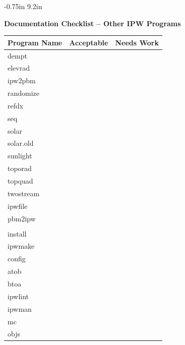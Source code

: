  
\setlength{\topmargin} {-0.75in}
\setlength{\textheight} {9.2in}
 
%
\newcommand{\marginsize}[1]{%
  \setlength{\oddsidemargin}{#1}
  \setlength{\textwidth}{8.5in}                %
  \addtolength{\textwidth}{-2\oddsidemargin}   %
  \setlength{\marginparwidth}{.75\oddsidemargin}%
  \setlength{\marginparsep}{.1\oddsidemargin}  %
  \addtolength{\oddsidemargin}{-1in}           %
  \setlength{\evensidemargin}{\oddsidemargin}  %
}
\marginsize{1.0in}
\pagestyle{empty}



\begin{center}
\Large\bf      Documentation Checklist -- Other IPW Programs
\vspace{.3in}
\end{center}
 
\begin{tabular}{||l|l|l||} \hline
Program Name & Acceptable & Needs Work \\ \hline\hline
dempt & & \\ \hline
elevrad & & \\ \hline
ipw2pbm & & \\ \hline
randomize & & \\ \hline
refdx & & \\ \hline
seq & & \\ \hline
solar & & \\ \hline
solar.old & & \\ \hline
sunlight & & \\ \hline
toporad & & \\ \hline
topquad & & \\ \hline
twostream & & \\ \hline
ipwfile & & \\ \hline
pbm2ipw & & \\ \hline
 & & \\ \hline
install & & \\ \hline
ipwmake & & \\ \hline
config & & \\ \hline
atob & & \\ \hline
btoa & & \\ \hline
ipwlint & & \\ \hline
ipwman & & \\ \hline
mc & & \\ \hline
objs & & \\ \hline
\end{tabular}

